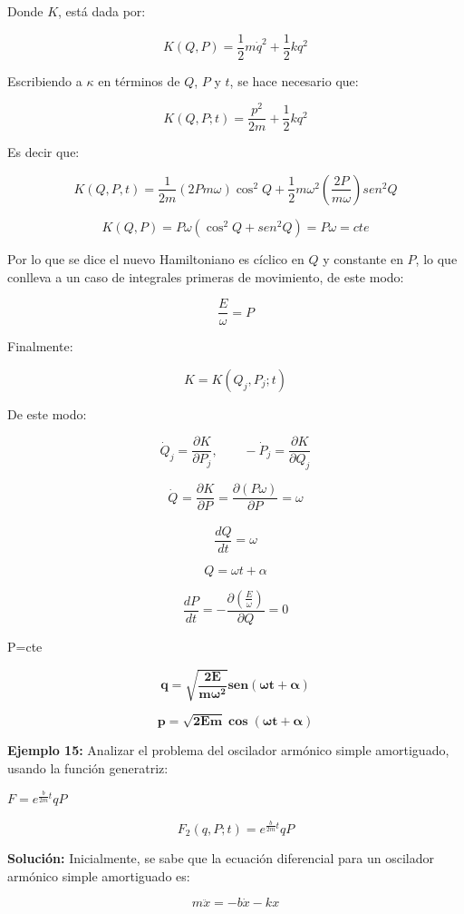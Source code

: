 \documentclass[]{article}
\begin{document}
Donde \(K\), está dada por:

\[K(Q,P) = \frac{1}{2}m{\dot{q}}^{2} + \frac{1}{2}kq^{2}\]

Escribiendo a \(\kappa\) en términos de \(Q\), \(P\) y \(t\), se hace
necesario que:

\[K(Q,P;t) = \frac{p^{2}}{2m} + \frac{1}{2}kq^{2}\]

Es decir que:

\[K(Q,P,t) = \frac{1}{2m}(2Pm\omega)\cos^{2}Q + \frac{1}{2}m\omega^{2}\left( \frac{2P}{m\omega} \right){sen}^{2}Q\]

\[K(Q,P) = P\omega\left( \cos^{2}Q + {sen}^{2}Q \right) = P\omega = cte\]

Por lo que se dice el nuevo Hamiltoniano es cíclico en \(Q\) y constante
en \(P\), lo que conlleva a un caso de integrales primeras de
movimiento, de este modo:

\[\frac{E}{\omega} = P\]

Finalmente:

\[K = K\left( Q_{j},P_{j};t \right)\]

De este modo:

\[{\dot{Q}}_{j} = \frac{\partial K}{\partial P_{j}},\ \ \ \ \ \ \ \ \  - {\dot{P}}_{j} = \frac{\partial K}{\partial Q_{j}}\]

\[{\dot{Q}}_{} = \frac{\partial K}{\partial P_{}} = \frac{\partial(P\omega)}{\partial P_{}} = \omega\]

\[\frac{dQ}{dt} = \omega\]

\[Q = \omega t + \alpha\]

\[\frac{dP}{dt} = - \frac{\partial\left( \frac{E}{\omega} \right)}{\partial Q} = 0\]

P=cte

\[\mathbf{q =}\sqrt{\frac{\mathbf{2}\mathbf{E}}{\mathbf{m}\mathbf{\omega}^{\mathbf{2}}}}\mathbf{sen}\left( \mathbf{\omega t + \alpha} \right)\]

\[\mathbf{p =}\sqrt{\mathbf{2}\mathbf{Em}}\mathbf{\cos}\left( \mathbf{\omega t + \alpha} \right)\]

\textbf{Ejemplo 15:} Analizar el problema del oscilador armónico simple
amortiguado, usando la función generatriz:

\(F = e^{\frac{b}{2m}t}qP\)

\[F_{2}(q,P;t) = e^{\frac{b}{2m}t}qP\]

\textbf{Solución:} Inicialmente, se sabe que la ecuación diferencial
para un oscilador armónico simple amortiguado es:

\[m\ddot{x} = - b\dot{x} - kx\]
\end{document}
